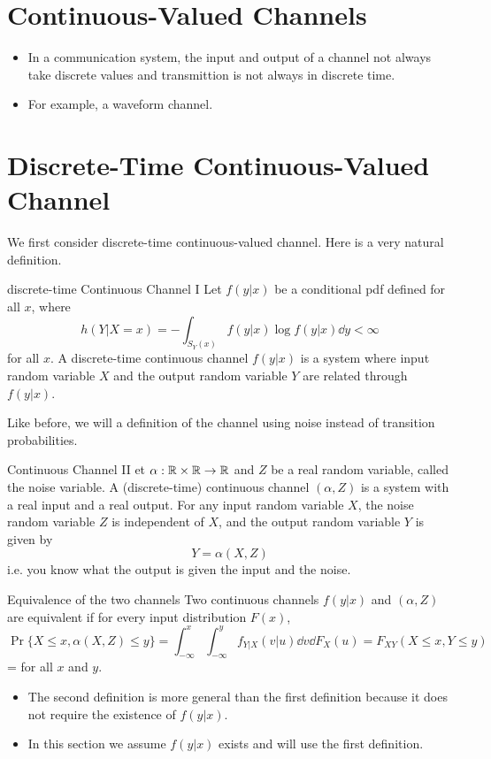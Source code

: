 \documentclass[../main.tex]{subfiles}
\begin{document}
\section{Continuous-Valued Channels}
\begin{itemize}
    \item In a communication system, the input and output of a channel not always take discrete values and transmittion is not always in discrete time.
    \item For example, a waveform channel.
\end{itemize}
\section{Discrete-Time Continuous-Valued Channel}
We first consider discrete-time continuous-valued channel. Here is a very natural definition.
\begin{gbox}{discrete-time Continuous Channel I}
    Let $f(y|x)$ be a conditional pdf defined for all $x$, where \[
    h(Y|X=x)=-\int_{S_Y(x)}f(y|x)\log f(y|x)\dd y < \infty
    \] for all $x$. A discrete-time continuous channel $f(y|x)$ is a system where input random variable $X$ and the output random variable $Y$ are related through $f(y|x)$.
\end{gbox}
Like before, we will a definition of the channel using noise instead of transition probabilities.
\begin{gbox}{Continuous Channel II}
    et $\alpha:\mathbb{R}\times \mathbb{R}\to \mathbb{R}$ and $Z$ be a real random variable, called the noise variable. A (discrete-time) continuous channel $(\alpha,Z)$ is a system with a real input and a real output. For any input random variable $X$, the noise random variable $Z$ is independent of $X$, and the output random variable $Y$ is given by \[
    Y=\alpha(X,Z)
    \] i.e. you know what the output is given the input and the noise.
\end{gbox}
\begin{gbox}{Equivalence of the two channels}
    Two continuous channels $f(y|x)$ and $(\alpha,Z)$ are equivalent if for every input distribution $F(x)$, \[
    \Pr\{X\leq x,\alpha(X,Z)\leq y\} = \int_{-\infty}^x\int_{-\infty}^y f_{Y|X}(v|u)\dd v\dd F_X(u) = F_{XY}(X\leq x, Y\leq y)
    \] = for all $x$ and $y$.
\end{gbox}
\begin{itemize}
    \item The second definition is more general than the first definition because it does not require the existence of $f(y|x)$. 
    \item In this section we assume $f(y|x)$ exists and will use the first definition.
\end{itemize}
\end{document}
